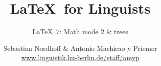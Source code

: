 


\title{
	\LaTeX\ for Linguists
}

\subtitle{\LaTeX\ 7: Math mode 2 \& trees}

\author[aMyP]{
	{\small Sebastian Nordhoff \& Antonio Machicao y Priemer}
	\\
	{\footnotesize \url{www.linguistik.hu-berlin.de/staff/amyp}}
}








\begin{frame}
  \HUtitle
\end{frame}





\nocite{Freitag&MyP15a}
\nocite{Knuth1986}
\nocite{Kopka94a}
	


%
%
%
%
%


